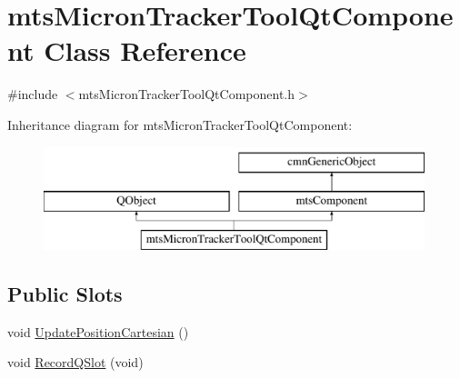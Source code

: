 \hypertarget{classmts_micron_tracker_tool_qt_component}{}\section{mts\+Micron\+Tracker\+Tool\+Qt\+Component Class Reference}
\label{classmts_micron_tracker_tool_qt_component}


{\ttfamily \#include $<$mts\+Micron\+Tracker\+Tool\+Qt\+Component.\+h$>$}

Inheritance diagram for mts\+Micron\+Tracker\+Tool\+Qt\+Component\+:\begin{figure}[H]
\begin{center}
\leavevmode
\includegraphics[height=3.000000cm]{db/dd8/classmts_micron_tracker_tool_qt_component}
\end{center}
\end{figure}
\subsection*{Public Slots}
\begin{DoxyCompactItemize}
\item 
void \hyperlink{classmts_micron_tracker_tool_qt_component_af8a039d539c05273dea49d4153223da9}{Update\+Position\+Cartesian} ()
\item 
void \hyperlink{classmts_micron_tracker_tool_qt_component_a8fa86b242a7ee1ceec2b00e5b84279d0}{Record\+Q\+Slot} (void)
\end{DoxyCompactItemize}
